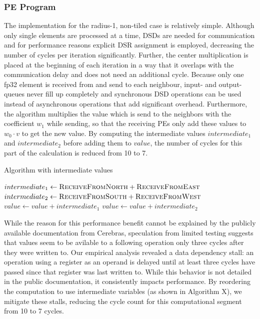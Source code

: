 \documentclass{article}
\begin{document}
\subsubsection{PE Program}
The implementation for the radius-1, non-tiled case is relatively simple.
Although only single elements are processed at a time, DSDs are needed for communication and for performance reasons explicit DSR assignment is employed, decreasing the number of cycles per iteration significantly.  
Further, the center multiplication is placed at the beginning of each iteration in a way that it overlaps with the communication delay and does not need an additional cycle.
Because only one fp32 element is received from and send to each neighbour, input- and output- queues never fill up completely and synchronous DSD operations can be used instead of asynchronous operations that add significant overhead.
Furthermore, the algorithm multiplies the value which is send to the neighbors with the coefficient $w_1$ while sending, so that the receiving PEs only add these values to $w_0 \cdot v$ to get the new value.
By computing the intermediate values $intermediate_1$ and $intermediate_2$ before adding them to $value$, the number of cycles for this part of the calculation is reduced from 10 to 7.
\begin{algorithm}
    \caption{Algorithm with intermediate values}
    \begin{algorithmic}[1]
        \State $intermediate_1 \gets \Call{ReceiveFromNorth}{} + \Call{ReceiveFromEast}{}$
        \State $intermediate_2 \gets \Call{ReceiveFromSouth}{} + \Call{ReceiveFromWest}{}$
        \State $value \gets value +intermediate_1$
        \State $value \gets value +intermediate_2$
    \end{algorithmic}
\end{algorithm}
While the reason for this performance benefit cannot be explained by the publicly available documentation from Cerebras, speculation from limited testing suggests that values seem to be avilable to a following operation only three cycles after they were written to.
Our empirical analysis revealed a data dependency stall: an operation using a register as an operand is delayed until at least three cycles have passed since that register was last written to. While this behavior is not detailed in the public documentation, it consistently impacts performance. By reordering the computation to use intermediate variables (as shown in Algorithm X), we mitigate these stalls, reducing the cycle count for this computational segment from 10 to 7 cycles.
\end{document}
